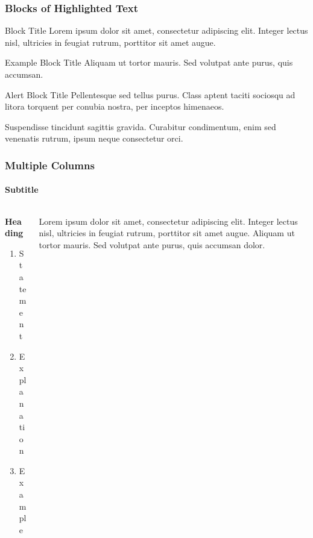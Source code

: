 \documentclass[
	11pt, %
]{beamer}
\begin{document}


\begin{frame}
    \frametitle{Blocks of Highlighted Text}

    \begin{block}{Block Title}
        Lorem ipsum dolor sit amet, consectetur adipiscing elit. Integer lectus nisl, ultricies in feugiat rutrum, porttitor sit amet augue.
    \end{block}

    \begin{exampleblock}{Example Block Title}
        Aliquam ut tortor mauris. Sed volutpat ante purus, quis accumsan.
    \end{exampleblock}

    \begin{alertblock}{Alert Block Title}
        Pellentesque sed tellus purus. Class aptent taciti sociosqu ad litora torquent per conubia nostra, per inceptos himenaeos.
    \end{alertblock}

    \begin{block}{} %
        Suspendisse tincidunt sagittis gravida. Curabitur condimentum, enim sed venenatis rutrum, ipsum neque consectetur orci.
    \end{block}
\end{frame}



\begin{frame}
    \frametitle{Multiple Columns}
    \framesubtitle{Subtitle} %

    \begin{columns}[c] %
        \begin{column}{0.45\textwidth} %
            \textbf{Heading}
            \begin{enumerate}
                \item Statement
                \item Explanation
                \item Example
            \end{enumerate}
        \end{column}
        \begin{column}{0.5\textwidth} %
            Lorem ipsum dolor sit amet, consectetur adipiscing elit. Integer lectus nisl, ultricies in feugiat rutrum, porttitor sit amet augue. Aliquam ut tortor mauris. Sed volutpat ante purus, quis accumsan dolor.
        \end{column}
    \end{columns}
\end{frame}
\end{document}
